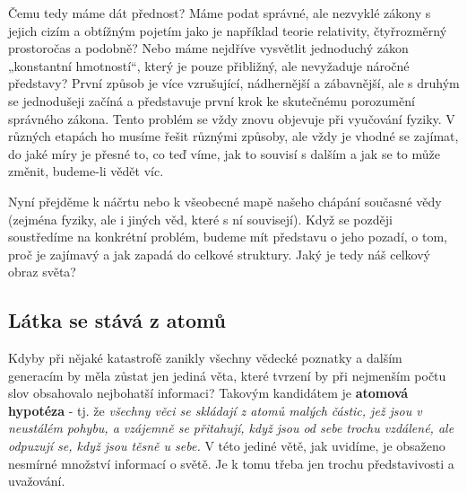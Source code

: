 {    Čemu tedy máme dát přednost? Máme podat správné, ale nezvyklé zákony s jejich cizím a obtížným 
    pojetím jako je například teorie relativity, čtyřrozměrný prostoročas a podobně? Nebo máme 
    nejdříve vysvětlit jednoduchý zákon „konstantní hmotností“, který je pouze přibližný, ale 
    nevyžaduje náročné představy? První způsob je více vzrušující, nádhernější a zábavnější, ale s 
    druhým se jednodušeji začíná a představuje první krok ke skutečnému porozumění správného 
    zákona. Tento problém se vždy znovu objevuje při vyučování fyziky. V různých etapách ho musíme 
    řešit různými způsoby, ale vždy je vhodné se zajímat, do jaké míry je přesné to, co teď víme, 
    jak to souvisí s dalším a jak se to může změnit, budeme-li vědět víc.
    
    Nyní přejděme k náčrtu nebo k všeobecné mapě našeho chápání současné vědy (zejména fyziky, ale 
    i jiných věd, které s ní souvisejí). Když se později soustředíme na konkrétní problém, budeme 
    mít představu o jeho pozadí, o tom, proč je zajímavý a jak zapadá do celkové struktury. Jaký je 
    tedy náš celkový obraz světa? \cite[s.~16]{Feynman01}
    
    \subsection{Látka se stává z atomů}
      Kdyby při nějaké katastrofě zanikly všechny vědecké poznatky a dalším generacím by měla 
      zůstat jen jediná věta, které tvrzení by při nejmenším počtu slov obsahovalo nejbohatší 
      informaci? Takovým kandidátem je \textbf{atomová hypotéza} - tj. že \emph{všechny věci se 
      skládají z atomů malých částic, jež jsou v neustálém pohybu,  a vzájemně se přitahují, když 
      jsou od sebe trochu vzdálené, ale odpuzují se, když jsou těsně u sebe.} V této jediné větě, 
      jak uvidíme, je obsaženo nesmírné množství informací o světě. Je k tomu třeba jen trochu 
      představivosti a uvažování.

}
